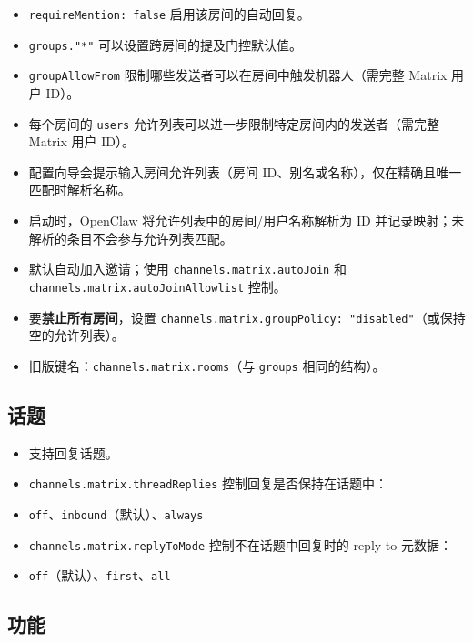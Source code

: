 \begin{itemize}
  \item \texttt{requireMention: false} 启用该房间的自动回复。
  \item \texttt{groups."*"} 可以设置跨房间的提及门控默认值。
  \item \texttt{groupAllowFrom} 限制哪些发送者可以在房间中触发机器人（需完整 Matrix 用户 ID）。
  \item 每个房间的 \texttt{users} 允许列表可以进一步限制特定房间内的发送者（需完整 Matrix 用户 ID）。
  \item 配置向导会提示输入房间允许列表（房间 ID、别名或名称），仅在精确且唯一匹配时解析名称。
  \item 启动时，OpenClaw 将允许列表中的房间/用户名称解析为 ID 并记录映射；未解析的条目不会参与允许列表匹配。
  \item 默认自动加入邀请；使用 \texttt{channels.matrix.autoJoin} 和 \texttt{channels.matrix.autoJoinAllowlist} 控制。
  \item 要\textbf{禁止所有房间}，设置 \texttt{channels.matrix.groupPolicy: "disabled"}（或保持空的允许列表）。
  \item 旧版键名：\texttt{channels.matrix.rooms}（与 \texttt{groups} 相同的结构）。
\end{itemize}


\subsection{话题}


\begin{itemize}
  \item 支持回复话题。
  \item \texttt{channels.matrix.threadReplies} 控制回复是否保持在话题中：
  \item \texttt{off}、\texttt{inbound}（默认）、\texttt{always}
  \item \texttt{channels.matrix.replyToMode} 控制不在话题中回复时的 reply-to 元数据：
  \item \texttt{off}（默认）、\texttt{first}、\texttt{all}
\end{itemize}


\subsection{功能}



